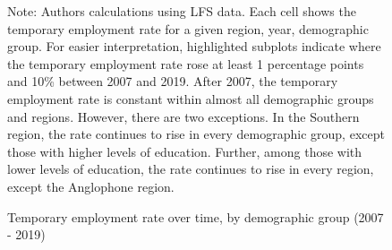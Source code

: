 \documentclass[12pt]{article}
\begin{document}
\begin{figure}
    \caption{Temporary employment rate over time, by demographic group (2007 - 2019)}
    \label{graph_eu_lfs_pct_combo_2}    
    \footnotesize{Note: Authors calculations using LFS data.  Each cell shows the temporary employment rate for a given region, year, demographic group.  For easier interpretation, highlighted subplots indicate where the temporary employment rate rose at least 1 percentage points and 10\% between 2007 and 2019. After 2007, the temporary employment rate is constant within almost all demographic groups and regions.  However, there are two exceptions.  In the Southern region, the rate continues to rise in every demographic group, except those with higher levels of education.  Further, among those with lower levels of education, the rate continues to rise in every region, except the Anglophone region.}
\end{figure}

\end{document}
